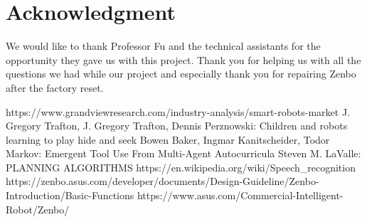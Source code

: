 \documentclass[conference]{IEEEtran}
\begin{document}
\section*{Acknowledgment}
We would like to thank Professor Fu and the technical assistants for the opportunity they gave us with this project.
Thank you for helping us with all the questions we had while our project and especially thank you for repairing Zenbo after the factory reset.\\
\begin{thebibliography}{00}
	 https://www.grandviewresearch.com/industry-analysis/smart-robots-market
	 J. Gregory Trafton, J. Gregory Trafton, Dennis Perznowski: Children and robots learning to play hide and seek
	 Bowen Baker, Ingmar Kanitscheider, Todor Markov: Emergent Tool Use From Multi-Agent Autocurricula
	 Steven M. LaValle: PLANNING ALGORITHMS
	 https://en.wikipedia.org/wiki/Speech\_recognition
	 https://zenbo.asus.com/developer/documents/Design-Guideline/Zenbo-Introduction/Basic-Functions
	 https://www.asus.com/Commercial-Intelligent-Robot/Zenbo/
\end{thebibliography}
\vspace{12pt}
\end{document}
